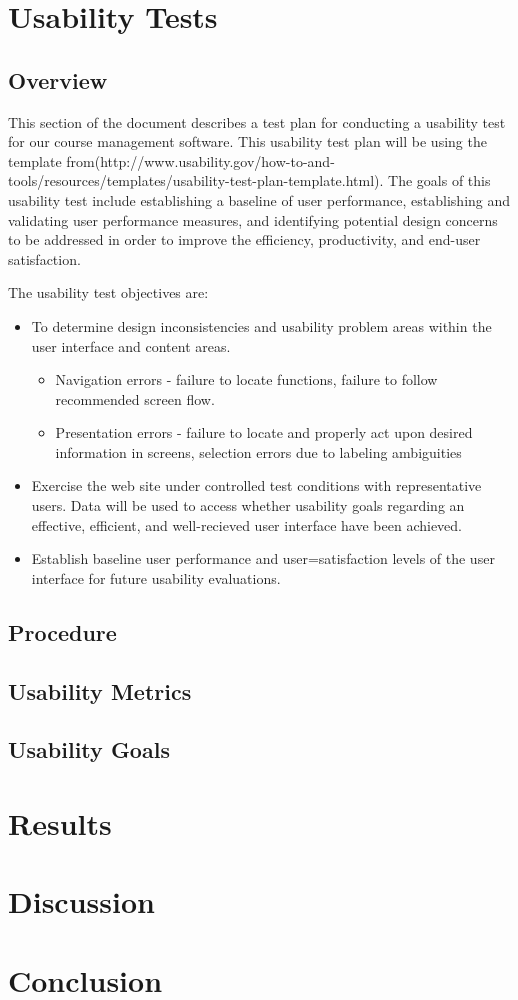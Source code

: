 \documentclass[10pt]{article}
\begin{document}
\newpage
\begin{multicols}{2}
\section*{Usability Tests}
\subsection*{Overview}
This section of the document describes a test plan for conducting a usability test for our course management software. This usability test plan will be using the template from(http://www.usability.gov/how-to-and-tools/resources/templates/usability-test-plan-template.html). The goals of this usability test  include establishing a baseline of user performance, establishing and validating user performance measures, and identifying potential design concerns to be addressed in order to improve the efficiency, productivity, and end-user satisfaction.

The usability test objectives are:
\begin{itemize}
\item To determine design inconsistencies and usability problem areas within the user interface and content areas. 
	\begin{itemize}
	\item Navigation errors - failure to locate functions, failure to follow recommended screen flow.
	\item Presentation errors - failure to locate and properly act upon desired information in screens, selection errors due to 				labeling ambiguities
	\end{itemize}
\item Exercise the web site under controlled test conditions with representative users. Data will be used to access whether usability goals regarding an effective, efficient, and well-recieved user interface have been achieved.
\item Establish baseline user performance and user=satisfaction levels of the user interface for future usability evaluations.
\end{itemize}
\subsection*{Procedure}
\subsection*{Usability Metrics}
\subsection*{Usability Goals}

\section*{Results}
\section*{Discussion}
\section*{Conclusion}
\end{multicols}
\end{document}
